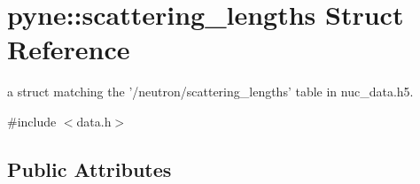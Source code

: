 \hypertarget{structpyne_1_1scattering__lengths}{\section{pyne\-:\-:scattering\-\_\-lengths Struct Reference}
\label{structpyne_1_1scattering__lengths}
}


a struct matching the '/neutron/scattering\-\_\-lengths' table in nuc\-\_\-data.\-h5.  




{\ttfamily \#include $<$data.\-h$>$}

\subsection*{Public Attributes}
